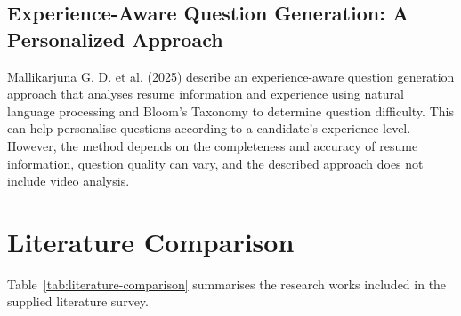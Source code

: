 \documentclass[12pt,a4paper,oneside]{report}
\begin{document}
\subsection{Experience-Aware Question Generation: A Personalized Approach}
Mallikarjuna G. D. et al. (2025) describe an experience-aware question generation approach that analyses resume information and experience using natural language processing and Bloom's Taxonomy to determine question difficulty. This can help personalise questions according to a candidate's experience level. However, the method depends on the completeness and accuracy of resume information, question quality can vary, and the described approach does not include video analysis.

\section{Literature Comparison}
Table~\ref{tab:literature-comparison} summarises the research works included in the supplied literature survey.
\end{document}
